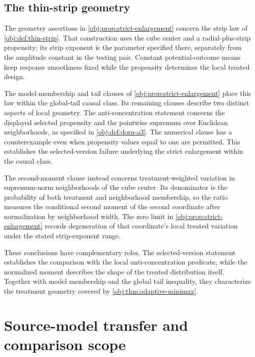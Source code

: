 \documentclass[11pt]{article}
\begin{document}
\subsection{The thin-strip geometry}

The geometry assertions in \cref{obj:prop:strict-enlargement} concern the strip law of \cref{obj:def:thin-strip}. That construction uses the cube center and a radial-plus-strip propensity; its strip exponent is the parameter specified there, separately from the amplitude constant in the testing pair. Constant potential-outcome means keep response smoothness fixed while the propensity determines the local treated design.

The model-membership and tail clauses of \cref{obj:prop:strict-enlargement} place this law within the global-tail causal class. Its remaining clauses describe two distinct aspects of local geometry. The anti-concentration statement concerns the displayed selected propensity and the pointwise supremum over Euclidean neighborhoods, as specified in \cref{obj:def:dorn-a3}. The numerical clause has a counterexample even when propensity values equal to one are permitted. This establishes the selected-version failure underlying the strict enlargement within the causal class.

The second-moment clause instead concerns treatment-weighted variation in supremum-norm neighborhoods of the cube center. Its denominator is the probability of both treatment and neighborhood membership, so the ratio measures the conditional second moment of the second coordinate after normalization by neighborhood width. The zero limit in \cref{obj:prop:strict-enlargement} records degeneration of that coordinate's local treated variation under the stated strip-exponent range.

These conclusions have complementary roles. The selected-version statement establishes the comparison with the local anti-concentration predicate, while the normalized moment describes the shape of the treated distribution itself. Together with model membership and the global tail inequality, they characterize the treatment geometry covered by \cref{obj:thm:adaptive-minimax}.


\section{Source-model transfer and comparison scope}
\end{document}
